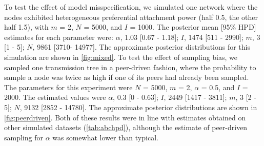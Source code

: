 To test the effect of model misspecification, we simulated one network where
the nodes exhibited heterogeneous preferential attachment power (half 0.5, the
other half 1.5), with $m$ = 2, $N$ = 5000, and $I$ = 1000. The posterior mean
[95\% HPD] estimates for each parameter were: 
$\alpha$, 
  1.03 
  [0.67 -
   1.18];
$I$,
  1474 
  [511 -
   2990];
$m$,
  3 
  [1 -
   5];
$N$,
  9861 
  [3710-
   14977].
The approximate posterior distributions for this simulation are shown in
\cref{fig:mixed}. To test the effect of sampling bias, we sampled one
transmission tree in a peer-driven fashion, where the probability to sample a
node was twice as high if one of its peers had already been sampled. The
parameters for this experiment were $N$ = 5000, $m$ = 2, $\alpha$ = 0.5, and
$I$ = 2000. The estimated values were
$\alpha$, 
  0.3 
  [0 -
   0.63];
$I$,
  2449 
  [1417 -
   3811];
$m$,
  3 
  [2 -
   5];
$N$,
  9132 
  [2852 -
   14780].
The approximate posterior distributions are shown in \cref{fig:peerdriven}. Both
of these results were in line with estimates obtained on other simulated
datasets (\cref{tab:abchpd}), although the estimate of peer-driven sampling for
$\alpha$ was somewhat lower than typical.


